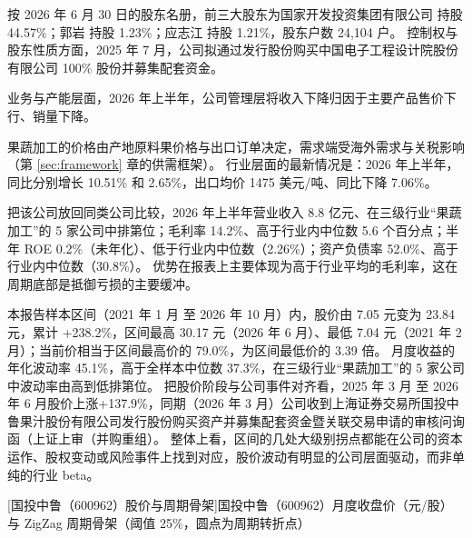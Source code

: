  按 2026 年 6 月 30 日的股东名册，前三大股东为国家开发投资集团有限公司 持股 44.57\%；郭岩 持股 1.23\%；应志江 持股 1.21\%，股东户数 24,104 户。 控制权与股东性质方面，2025 年 7 月，公司拟通过发行股份购买中国电子工程设计院股份有限公司 100\% 股份并募集配套资金。

 业务与产能层面，2026 年上半年，公司管理层将收入下降归因于主要产品售价下行、销量下降。

 果蔬加工的价格由产地原料果价格与出口订单决定，需求端受海外需求与关税影响（第 \ref{sec:framework} 章的供需框架）。 行业层面的最新情况是：2026 年上半年，同比分别增长 10.51\% 和 2.65\%，出口均价 1475 美元/吨、同比下降 7.06\%。

 把该公司放回同类公司比较，2026 年上半年营业收入 8.8 亿元、在三级行业“果蔬加工”的 5 家公司中排第位；毛利率 14.2\%、高于行业内中位数 5.6 个百分点；半年 ROE 0.2\%（未年化）、低于行业内中位数（2.26\%）；资产负债率 52.0\%、高于行业内中位数（30.8\%）。 优势在报表上主要体现为高于行业平均的毛利率，这在周期底部是抵御亏损的主要缓冲。

 本报告样本区间（2021 年 1 月 至 2026 年 10 月）内，股价由 7.05 元变为 23.84 元，累计 +238.2\%，区间最高 30.17 元（2026 年 6 月）、最低 7.04 元（2021 年 2 月）；当前价相当于区间最高价的 79.0\%，为区间最低价的 3.39 倍。 月度收益的年化波动率 45.1\%，高于全样本中位数 37.3\%，在三级行业“果蔬加工”的 5 家公司中波动率由高到低排第位。 把股价阶段与公司事件对齐看，2025 年 3 月 至 2026 年 6 月股价上涨+137.9\%，同期（2026 年 3 月）公司收到上海证券交易所国投中鲁果汁股份有限公司发行股份购买资产并募集配套资金暨关联交易申请的审核问询函（上证上审（并购重组）。 整体上看，区间的几处大级别拐点都能在公司的资本运作、股权变动或风险事件上找到对应，股价波动有明显的公司层面驱动，而非单纯的行业 beta。

\begin{center}
\begin{minipage}{\textwidth}\centering
{}

[国投中鲁（600962）股价与周期骨架]{国投中鲁（600962）月度收盘价（元/股）与 ZigZag 周期骨架（阈值 25\%，圆点为周期转折点）}
\end{minipage}
\end{center}

